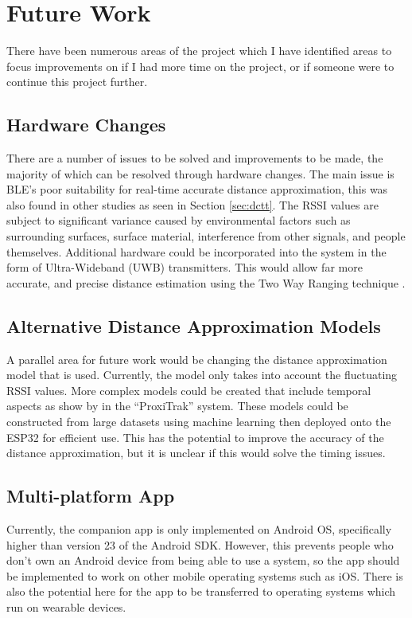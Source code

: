 \documentclass{l4proj}
\begin{document}
\section{Future Work}

There have been numerous areas of the project which I have identified areas to focus improvements on if I had more time on the project, or if someone were to continue this project further.

\subsection{Hardware Changes}

There are a number of issues to be solved and improvements to be made, the majority of which can be resolved through hardware changes. The main issue is BLE's poor suitability for real-time accurate distance approximation, this was also found in other studies as seen in Section \ref{sec:dctt}. The RSSI values are subject to significant variance caused by environmental factors such as surrounding surfaces, surface material, interference from other signals, and people themselves. Additional hardware could be incorporated into the system in the form of Ultra-Wideband (UWB) transmitters. This would allow far more accurate, and precise distance estimation using the Two Way Ranging technique \citep{inpixon_ultra_wideband_2021}.

\subsection{Alternative Distance Approximation Models}

A parallel area for future work would be changing the distance approximation model that is used. Currently, the model only takes into account the fluctuating RSSI values. More complex models could be created that include temporal aspects as show by \citet{chandel_proxitrak_2020} in the “ProxiTrak” system. These models could be constructed from large datasets using machine learning then deployed onto the ESP32 for efficient use. This has the potential to improve the accuracy of the distance approximation, but it is unclear if this would solve the timing issues.

\subsection{Multi-platform App}

Currently, the companion app is only implemented on Android OS, specifically higher than version 23 of the Android SDK. However, this prevents people who don't own an Android device from being able to use a system, so the app should be implemented to work on other mobile operating systems such as iOS. There is also the potential here for the app to be transferred to operating systems which run on wearable devices.
\end{document}
